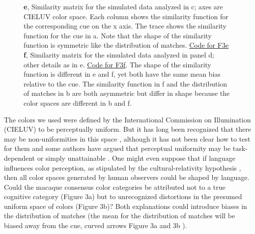 \begin{figure}
\begin{fullwidth}
{    \textbf{e}, Similarity matrix for the simulated data analyzed in c; axes are CIELUV color space. Each column shows the similarity function for the corresponding cue on the x axis. The trace shows the similarity function for the cue in a. Note that the shape of the similarity function is symmetric like the distribution of matches. \href{https://github.com/NEI-LSR/MacaqueColorCategories/blob/main/Outputs/Paper/Figures/working/F3_TCCModel/Code/F3ace_TCCModel_OffsetGaussian.m}{Code for F3e} \textbf{f}, Similarity matrix for the simulated data analyzed in panel d; other details as in e. \href{https://github.com/NEI-LSR/MacaqueColorCategories/blob/main/Outputs/Paper/Figures/working/F3_TCCModel/Code/F3bdf_TCCModel_StimulusSpaceNonUnifomity.m}{Code for F3f}. The shape of the similarity function is different in e and f, yet both have the same mean bias relative to the cue. The similarity function in f and the distribution of matches in b are both asymmetric but differ in shape because the color spaces are different in b and f.}
    \label{fig:TCCDemo}
    \end{fullwidth}
\end{figure}

The colors we used were defined by the International Commission on Illumination (CIELUV) to be perceptually uniform. 
But it has long been recognized that there may be non-uniformities in this space \citep{stockman_colorimetry_2010}, although it has not been clear how to test for them and some authors have argued that perceptual uniformity may be task-dependent or simply unattainable \citep{judd_ideal_1969}. One might even suppose that if language influences color perception, as stipulated by the cultural-relativity hypothesis \citep{roberson_color_2005}, then all color spaces generated by human observers could be shaped by language. Could the macaque consensus color categories be attributed not to a true cognitive category (Figure 3a) but to unrecognized distortions in the presumed uniform space of colors (Figure 3b)? Both explanations could introduce biases in the distribution of matches (the mean for the distribution of matches will be biased away from the cue, curved arrows Figure 3a and 3b ).

